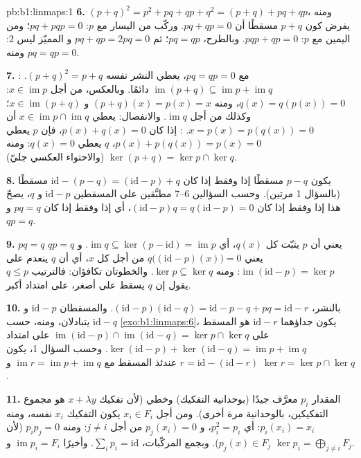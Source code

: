 \begin{solution}{pb:b1:linmaps:1}
\textbf{6.} $(p + q)^2 = p^2 + pq + qp + q^2 = (p + q) + pq +
qp$، ومنه يفرض كون $p + q$ مسقطًا أن $pq + qp = 0$. وركّب من
اليسار مع $p$: $pq + pqp = 0$؛ ومن اليمين مع $p$: $pqp + qp
= 0$. وبالطرح، $pq = qp$؛ ثم $pq + qp = 2pq = 0$ و
المميّز ليس $2$: ومنه $pq = qp = 0$.

\textbf{7.} مع $pq = qp = 0$، يعطي النشر نفسه $(p +
q)^2 = p + q$. : $\operatorname{im}(p + q) \subseteq
\operatorname{im} p + \operatorname{im} q$ دائمًا. وبالعكس،
من أجل $x \in \operatorname{im} p$: $q(x) = q(p(x)) = 0$، ومنه $(p +
q)(x) = p(x) = x$ و $x \in \operatorname{im}(p+q)$؛ وكذلك من أجل
$\operatorname{im} q$. والانفصال: يعطي $x \in \operatorname{im} p
\cap \operatorname{im} q$ أن $x = p(x) = p(q(x)) = 0$.
: إذا كان $p(x) + q(x) = 0$، فإن  $p$ يعطي $p(x) +
p(q(x)) = p(x) = 0$،  $q$ يعطي $q(x) = 0$: ومنه $\ker(p
+ q) = \ker p \cap \ker q$ (والاحتواء العكسي جليّ).

\textbf{8.} يكون $p - q$ مسقطًا إذا وفقط إذا كان $\mathrm{id} - (p - q) =
(\mathrm{id} - p) + q$ مسقطًا (بالسؤال 1 مرتين). وحسب السؤالين
6--7 مطبَّقين على المسقطين $\mathrm{id} - p$ و $q$، يصحّ هذا
إذا وفقط إذا كان $(\mathrm{id} - p)q = q(\mathrm{id} - p) = 0$، أي
إذا وفقط إذا كان $pq = q$ و $qp = q$.

\textbf{9.} $pq = q$ يعني أن $p$ يثبّت كل $q(x)$، أي
$\operatorname{im} q \subseteq \ker(p - \mathrm{id}) =
\operatorname{im} p$. و $qp = q$ يعني $q\bigl((\mathrm{id} -
p)(x)\bigr) = 0$ من أجل كل $x$، أي أن $q$ ينعدم على
$\operatorname{im}(\mathrm{id} - p) = \ker p$: ومنه $\ker p \subseteq
\ker q$. والخطوتان تكافؤان: فالترتيب $q \leq p$ يقول إن
$q$ يسقط على  أصغر، على امتداد  أكبر.

\textbf{10.} بالنشر، $(\mathrm{id} - p)(\mathrm{id} - q) =
\mathrm{id} - p - q + pq = \mathrm{id} - r$. والمسقطان
$\mathrm{id} - p$ و $\mathrm{id} - q$ يتبادلان، ومنه، حسب
\cref{exo:b1:linmaps:6}، يكون جداؤهما $\mathrm{id} - r$ هو
المسقط على $\operatorname{im}(\mathrm{id} - p) \cap
\operatorname{im}(\mathrm{id} - q) = \ker p \cap \ker q$ على امتداد
$\ker(\mathrm{id} - p) + \ker(\mathrm{id} - q) =
\operatorname{im} p + \operatorname{im} q$. وحسب السؤال 1، يكون $r =
\mathrm{id} - (\mathrm{id} - r)$ عندئذ المسقط مع
$\operatorname{im} r = \operatorname{im} p + \operatorname{im}
q$ و $\ker r = \ker p \cap \ker q$.

\textbf{11.} المقدار $p_i$ معرَّف جيدًا (بوحدانية
التفكيك) وخطي (لأن تفكيك $x + \lambda y$
هو مجموع التفكيكين، بالوحدانية مرة أخرى). ومن أجل $x_i
\in F_i$ يكون التفكيك $x_i$ نفسه، ومنه $p_i(x_i) = x_i$:
أي $p_i^2 = p_i$، و $p_j(x_i) = 0$ من أجل $j \neq i$: ومنه $p_i p_j = 0$
(لأن $p_j(x) \in F_j$). وبجمع المركّبات، $\sum_i p_i =
\mathrm{id}$. وأخيرًا $\operatorname{im} p_i = F_i$ و $\ker
p_i = \bigoplus_{j \neq i} F_j$.


\end{solution}
